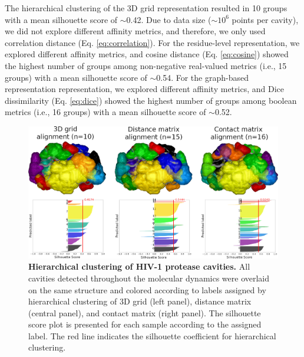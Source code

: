 \documentclass[Ingles]{phdthesis}
\def\ie{i.e.\onedot}
\begin{document}
The hierarchical clustering of the 3D grid representation resulted in 10 groups with a mean silhouette score of $\sim$0.42. Due to data size ($\sim$$10^6$ points per cavity), we did not explore different affinity metrics, and therefore, we only used correlation distance (Eq. \ref{eq:correlation}). For the residue-level representation, we explored different affinity metrics, and cosine distance (Eq. \ref{eq:cosine}) showed the highest number of groups among non-negative real-valued metrics (\ie, 15 groups) with a mean silhouette score of $\sim$0.54. For the graph-based representation representation, we explored different affinity metrics, and Dice dissimilarity (Eq. \ref{eq:dice}) showed the highest number of groups among boolean metrics (\ie, 16 groups) with a mean silhouette score of $\sim$0.52.

\begin{figure}[h]
  \centering
  \includegraphics[scale=1]{images/HIV-1-clustering-results.png}
  \caption[Hierarchical clustering of HIV-1 protease cavities]{\textbf{Hierarchical clustering of HIV-1 protease cavities.} All cavities detected throughout the molecular dynamics were overlaid on the same structure and colored according to labels assigned by hierarchical clustering of 3D grid (left panel), distance matrix (central panel), and contact matrix (right panel). The silhouette score plot is presented for each sample according to the assigned label. The red line indicates the silhouette coefficient for hierarchical clustering.}
  \label{fig:hiv-1-clustering-results}
\end{figure}
\end{document}
